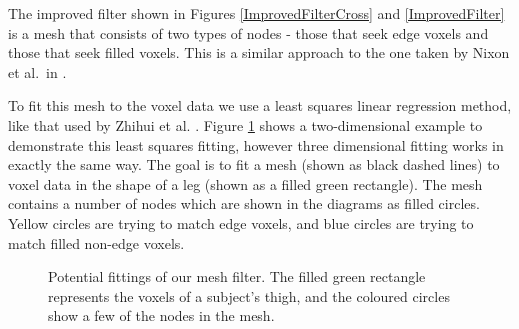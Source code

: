\documentclass[a4paper,12pt]{article}
\begin{document}
The improved filter shown in Figures \ref{ImprovedFilterCross} and \ref{ImprovedFilter} is a mesh that consists of two types of nodes - those that seek edge voxels and those that seek filled voxels.
This is a similar approach to the one taken by Nixon et al.\ in \cite{GaitBook}.

\clearpage
To fit this mesh to the voxel data we use a least squares linear regression method, like that used by Zhihui et al. \cite{LinearModelFitting}.
Figure \ref{FittingImages} shows a two-dimensional example to demonstrate this least squares fitting, however three dimensional fitting works in exactly the same way.
The goal is to fit a mesh (shown as black dashed lines) to voxel data in the shape of a leg (shown as a filled green rectangle).
The mesh contains a number of nodes which are shown in the diagrams as filled circles.
Yellow circles are trying to match edge voxels, and blue circles are trying to match filled non-edge voxels.

\begin{figure}[bt]
	\centering
	\qquad
	\caption{Potential fittings of our mesh filter.
		The filled green rectangle represents the voxels of a subject's thigh,
		and the coloured circles show a few of the nodes in the mesh.}
	\label{FittingImages}
\end{figure}
\end{document}
